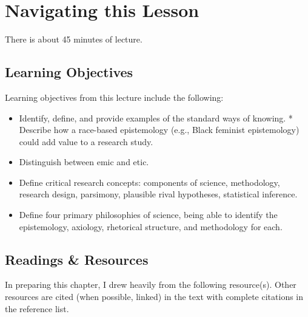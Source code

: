 \documentclass[
  english,
]{book}
\providecommand{\tightlist}{%
  \setlength{\itemsep}{0pt}\setlength{\parskip}{0pt}}
\begin{document}
\hypertarget{navigating-this-lesson-1}{%
\section{Navigating this Lesson}\label{navigating-this-lesson-1}}

There is about 45 minutes of lecture.

\hypertarget{learning-objectives-1}{%
\subsection{Learning Objectives}\label{learning-objectives-1}}

Learning objectives from this lecture include the following:

\begin{itemize}
\tightlist
\item
  Identify, define, and provide examples of the standard ways of knowing. * Describe how a race-based epistemology (e.g., Black feminist epistemology) could add value to a research study.
\item
  Distinguish between emic and etic.
\item
  Define critical research concepts: components of science, methodology, research design, parsimony, plausible rival hypotheses, statistical inference.
\item
  Define four primary philosophies of science, being able to identify the epistemology, axiology, rhetorical structure, and methodology for each.
\end{itemize}

\hypertarget{readings-resources-1}{%
\subsection{Readings \& Resources}\label{readings-resources-1}}

In preparing this chapter, I drew heavily from the following resource(s). Other resources are cited (when possible, linked) in the text with complete citations in the reference list.
\end{document}
